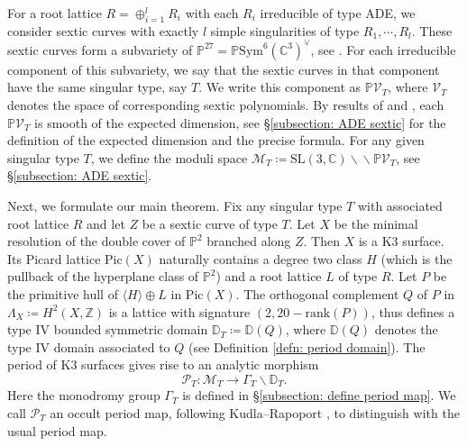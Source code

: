 \documentclass[12pt,reqno,a4paper]{amsart}
\theoremstyle{remark}
\theoremstyle{definition}
\begin{document}
For a root lattice $R=\oplus_{i=1}^l R_i$ with each $R_i$ irreducible of type ADE, we consider sextic curves with exactly $l$ simple singularities of type $R_1, \cdots, R_l$. These sextic curves form a subvariety of $\mathbb{P}^{27}=\mathbb{P}\mathrm{Sym}^6(\mathbb{C}^3)^\vee$, see \cite[Prop 2.1]{greuel1996equianalytic}. For each irreducible component of this subvariety, we say that the sextic curves in that component have the same singular type, say $T$. We write this component as $\mathbb{P}\mathcal{V}_T$, where $\mathcal{V}_T$ denotes the space of corresponding sextic polynomials.
By results of \cite[Corollary 5.1(b)]{greuel1996equianalytic} and \cite[Theorem 2.5.1]{greuel2021plane}, each $\mathbb{P}\mathcal{V}_T$ is smooth of the expected dimension, see \S \ref{subsection: ADE sextic} for the definition of the expected dimension and the precise formula.
For any given singular type $T$, we define the moduli space $\mathcal{M}_T\coloneqq\mathrm{SL}(3, \mathbb{C})\backslash\!\! \backslash\mathbb{P}\mathcal{V}_T$, see \S \ref{subsection: ADE sextic}.


Next, we formulate our main theorem. Fix any singular type $T$ with associated root lattice $R$ and let $Z$ be a sextic curve of type $T$. Let $X$ be the minimal resolution of the double cover of $\mathbb{P}^2$ branched along $Z$. Then $X$ is a K3 surface. Its Picard lattice $\mathrm{Pic}(X)$ naturally contains a degree two class $H$ (which is the pullback of the hyperplane class of $\mathbb{P}^2$) and a root lattice $L$ of type $R$. Let $P$ be the primitive hull of $\langle H\rangle\oplus L$ in $\mathrm{Pic}(X)$.
The orthogonal complement $Q$ of $P$ in $\Lambda_X\coloneqq H^2(X,\mathbb{Z})$ is a lattice with signature $(2,20-\mathrm{rank} (P))$, thus defines a type IV bounded symmetric domain $\mathbb{D}_T\coloneqq\mathbb{D}(Q)$, where $\mathbb{D}(Q)$ denotes the type IV domain associated to $Q$ (see Definition \ref{defn: period domain}).
The period of K3 surfaces gives rise to an analytic morphism
\[
\mathscr{P}_T\colon \mathcal{M}_T\to \Gamma_T\backslash\mathbb{D}_T.
\]
Here the monodromy group $\Gamma_T$ is defined in \S\ref{subsection: define period map}. We call $\mathscr{P}_T$ an occult period map, following Kudla--Rapoport \cite{kudla2012occult}, to distinguish with the usual period map.
\end{document}
